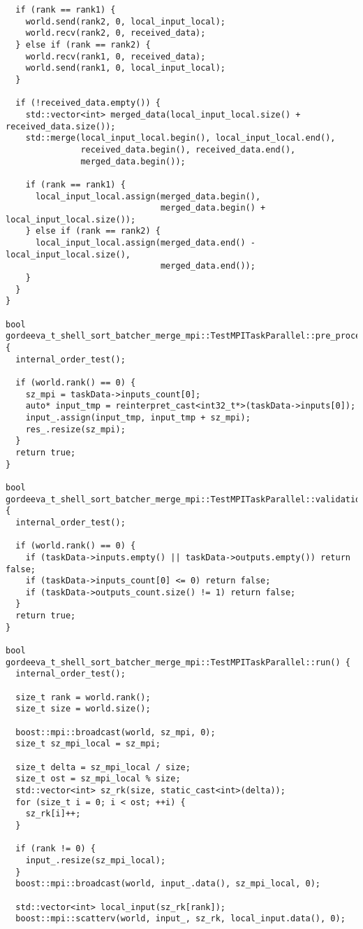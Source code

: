 \documentclass[a4paper,12pt]{article}
\begin{document}
\begin{verbatim}
  if (rank == rank1) {
    world.send(rank2, 0, local_input_local);
    world.recv(rank2, 0, received_data);
  } else if (rank == rank2) {
    world.recv(rank1, 0, received_data);
    world.send(rank1, 0, local_input_local);
  }

  if (!received_data.empty()) {
    std::vector<int> merged_data(local_input_local.size() + received_data.size());
    std::merge(local_input_local.begin(), local_input_local.end(),
               received_data.begin(), received_data.end(),
               merged_data.begin());

    if (rank == rank1) {
      local_input_local.assign(merged_data.begin(),
                               merged_data.begin() + local_input_local.size());
    } else if (rank == rank2) {
      local_input_local.assign(merged_data.end() - local_input_local.size(),
                               merged_data.end());
    }
  }
}

bool gordeeva_t_shell_sort_batcher_merge_mpi::TestMPITaskParallel::pre_processing() {
  internal_order_test();

  if (world.rank() == 0) {
    sz_mpi = taskData->inputs_count[0];
    auto* input_tmp = reinterpret_cast<int32_t*>(taskData->inputs[0]);
    input_.assign(input_tmp, input_tmp + sz_mpi);
    res_.resize(sz_mpi);
  }
  return true;
}

bool gordeeva_t_shell_sort_batcher_merge_mpi::TestMPITaskParallel::validation() {
  internal_order_test();

  if (world.rank() == 0) {
    if (taskData->inputs.empty() || taskData->outputs.empty()) return false;
    if (taskData->inputs_count[0] <= 0) return false;
    if (taskData->outputs_count.size() != 1) return false;
  }
  return true;
}

bool gordeeva_t_shell_sort_batcher_merge_mpi::TestMPITaskParallel::run() {
  internal_order_test();

  size_t rank = world.rank();
  size_t size = world.size();

  boost::mpi::broadcast(world, sz_mpi, 0);
  size_t sz_mpi_local = sz_mpi;

  size_t delta = sz_mpi_local / size;
  size_t ost = sz_mpi_local % size;
  std::vector<int> sz_rk(size, static_cast<int>(delta));
  for (size_t i = 0; i < ost; ++i) {
    sz_rk[i]++;
  }

  if (rank != 0) {
    input_.resize(sz_mpi_local);
  }
  boost::mpi::broadcast(world, input_.data(), sz_mpi_local, 0);

  std::vector<int> local_input(sz_rk[rank]);
  boost::mpi::scatterv(world, input_, sz_rk, local_input.data(), 0);


\end{verbatim}
\end{document}
